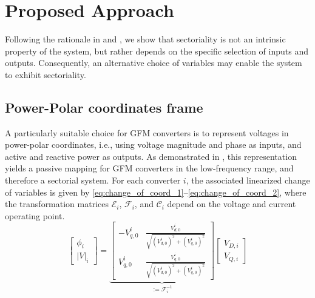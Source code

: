 \section{Proposed Approach}
Following the rationale in \cite{deyPassivityBasedDecentralizedCriteria2023} and \cite{chenExtendedFrequencyDomainPassivity2025a}, we show that sectoriality is not an intrinsic property of the system, but rather depends on the specific selection of inputs and outputs. Consequently, an alternative choice of variables may enable the system to exhibit sectoriality.

\subsection{Power-Polar coordinates frame}
A particularly suitable choice for GFM converters is to represent voltages in power-polar coordinates, i.e., using voltage magnitude and phase as inputs, and active and reactive power as outputs. As demonstrated in \cite{deyAnalysisPassivityCharacteristics2021}, this representation yields a passive mapping for GFM converters in the low-frequency range, and therefore a sectorial system. For each converter $i$, the associated linearized change of variables is given by \eqref{eq:change_of_coord_1}–\eqref{eq:change_of_coord_2}, where the transformation matrices $\mathcal{E}_i$, $\mathcal{F}_i$, and $\mathcal{C}_i$ depend on the voltage and current operating point.
\begin{equation}
    \begin{bmatrix}
        \phi_i \\ |V|_i 
    \end{bmatrix} =
    \underbrace{\begin{bmatrix}
        -V^i_{q,0} & \frac{V^i_{d,0}}{\sqrt{(V^i_{d,0})^2+(V^i_{q,0})^2}} \\
        V^i_{q,0} & \frac{V^i_{q,0}}{\sqrt{(V^i_{d,0})^2+(V^i_{q,0})^2}}
    \end{bmatrix}}_{:=\mathcal{F}_i^{-1}}
    \begin{bmatrix}
        V_{D,i} \\ V_{Q,i} 
    \end{bmatrix}
    \label{eq:change_of_coord_1}
\end{equation}

